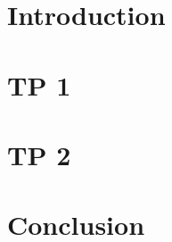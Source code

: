 
\section{Introduction}


\section{TP 1}


\section{TP 2}


\section{Conclusion}


\pagebreak


\pagebreak




\pagebreak
\printnomenclature
